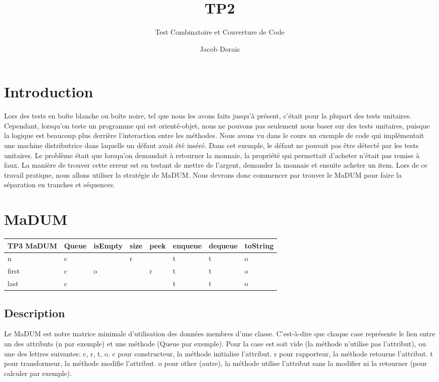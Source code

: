 \documentclass[11pt]{article}
\title{TP2}
\subtitle{Test Combinatoire et Couverture de Code}
\author{Jacob Dorais}{Billy Bouchard}{Gr 02}
\begin{document}
\maketitle
\section{Introduction}
Lors des tests en boîte blanche ou boîte noire, tel que nous les avons faits jusqu'à présent, c'était pour la plupart des tests unitaires.
Cependant, lorsqu'on teste un programme qui est orienté-objet, nous ne pouvons pas seulement nous baser sur des tests unitaires, puisque la logique est beaucoup plus derrière l'interaction entre les méthodes.
Nous avons vu dans le cours un exemple de code qui implémentait une machine distributrice dans laquelle un défaut avait été inséré.
Dans cet exemple, le défaut ne pouvait pas être détecté par les tests unitaires.
Le problème était que lorsqu'on demandait à retourner la monnaie, la propriété qui permettait d'acheter n'était pas remise à faux.
La manière de trouver cette erreur est en testant de mettre de l'argent, demander la monnaie et ensuite acheter un item.
Lors de ce travail pratique, nous allons utiliser la stratégie de MaDUM.
Nous devrons donc commencer par trouver le MaDUM pour faire la séparation en tranches et séquences.

\section{MaDUM}

\begin{tabular}{|l|l|l|l|l|l|l|l|}
	\hline
	TP3 MaDUM   & Queue  & isEmpty   & size    & peek  & enqueue   & dequeue  & toString  \\ \hline
	n           & c      &           & r       &       & t         & t        & o         \\ \hline
	first       & c      & o         &         & r     & t         & t        & o         \\ \hline
	last        & c      &           &         &       & t         & t        & o         \\ \hline

\end{tabular}

\subsection{Description}

Le MaDUM est notre matrice minimale d'utilisation des données membres d'une classe.
C'est-à-dire que chaque case représente le lien entre un des attributs (n par exemple) et une méthode (Queue par exemple).
Pour la case est soit vide (la méthode n'utilise pas l'attribut), ou une des lettres suivantes: c, r, t, o.
c pour constructeur, la méthode initialise l'attribut.
r pour rapporteur, la méthode retourne l'attribut.
t pour transformeur, la méthode modifie l'attribut.
o pour other (autre), la méthode utilise l'attribut sans la modifier ni la retourner (pour calculer par exemple).
\end{document}
